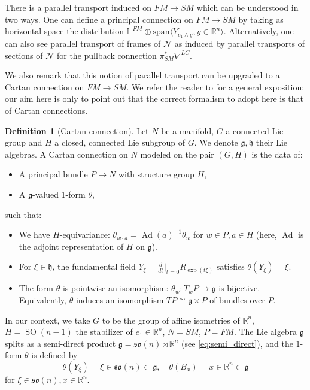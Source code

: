 \documentclass[12pt]{amsart}
\numberwithin{numbering}{section}
\theoremstyle{plain}
\theoremstyle{definition}
\newtheorem{df}[numbering]{Definition}
\theoremstyle{remark}
\numberwithin{equation}{section}
\DeclareMathOperator{\Ad}{Ad}
\DeclareMathOperator{\SO}{SO}
\newcommand{\psm}{\pi_{SM}}
\newcommand{\R}{\mathbb{R}}
\newcommand{\frk}[1]{\mathfrak{#1}}
\begin{document}
There is a parallel transport induced on $FM \to SM$ which can be understood in two ways. One can define a principal connection on $FM \to SM$ by taking as horizontal space the distribution $\mathbb{H}^{FM} \oplus \mathrm{span}\langle Y_{e_1 \wedge y}, y \in \R^n \rangle$. Alternatively, one can also see parallel transport of frames of $\mathcal{N}$ as induced by parallel transports of sections of $\mathcal{N}$ for the pullback connection $\psm^* \nabla^{LC}$.

\medskip

We also remark that this notion of parallel transport can be upgraded to a Cartan connection on $FM \to SM$. We refer the reader to \cite{sharpe2000differential} for a general exposition; our aim here is only to point out that the correct formalism to adopt here is that of Cartan connections.

\begin{df}[Cartan connection]
Let $N$ be a manifold, $G$ a connected Lie group and $H$ a closed, connected Lie subgroup of $G$. We denote $\frk{g}, \frk{h}$ their Lie algebras. A Cartan connection on $N$ modeled on the pair $(G, H)$ is the data of:
\begin{itemize}
\item A principal bundle $P \to N$ with structure group $H$, 
\item A $\frk{g}$-valued 1-form $\theta$,
\end{itemize}
such that:
\begin{itemize}
\item We have $H$-equivariance: $\theta_{w \cdot a} = \Ad(a)^{-1} \theta_w$ for $w \in P, a \in H$ (here, $\Ad$ is the adjoint representation of $H$ on $\frk{g}$).
\item For $\xi \in \frk{h}$, the fundamental field $Y_\xi = \frac{d}{dt} \vert_{t = 0} R_{\exp(t \xi)}$ satisfies $\theta(Y_\xi) = \xi$.
\item The form $\theta$ is pointwise an isomorphism: $\theta_w: T_w P \to \frk{g}$ is bijective. Equivalently, $\theta$ induces an isomorphism $TP \cong \frk{g} \times P$ of bundles over $P$.
\end{itemize}
\end{df}

In our context, we take $G$ to be the group of affine isometries of $\R^n$, $H = \SO(n-1)$ the stabilizer of $e_1 \in \R^n$, $N = SM$, $P = FM$. The Lie algebra $\frk{g}$ splits as a semi-direct product $\frk{g} = \frk{so}(n) \rtimes \R^n$ (see \eqref{eq:semi_direct}), and the $1$-form $\theta$ is defined by 
\[ \theta(Y_\xi) = \xi \in \frk{so}(n) \subset \frk{g}, \quad \theta(B_x) = x \in \R^n \subset \frk{g} \] 
for $\xi \in \frk{so}(n), x \in \R^n$. 
\end{document}

